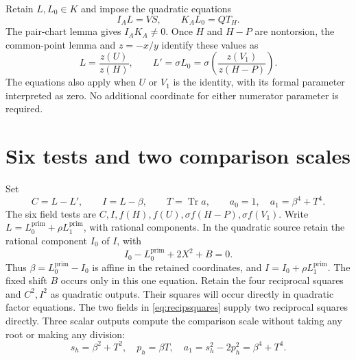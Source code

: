 \documentclass[11pt,a4paper]{article}
\DeclareMathOperator{\Tr}{Tr}\DeclareMathOperator{\Nm}{N}
\begin{document}
Retain $L,L_0\in K$ and impose the quadratic equations
\begin{equation}\label{eq:ratios}
                         I_AL=VS,\qquad K_AL_0=QT_H.
\end{equation}
The pair-chart lemma gives $I_AK_A\ne0$. Once $H$ and $H-P$ are
nontorsion, the common-point lemma and $z=-x/y$ identify these values as
\[
 L=\frac{z(U)}{z(H)},\qquad
 L'=\sigma L_0=\sigma\!\left(\frac{z(V_1)}{z(H-P)}\right).
\]
The equations also apply when $U$ or $V_1$ is the identity, with its
formal parameter interpreted as zero. No additional coordinate for
either numerator parameter is required.

\section{Six tests and two comparison scales}

Set
\[
 C=L-L',\qquad I=L-\beta,\qquad T=\Tr a,
 \qquad a_0=1,\quad a_1=\beta^4+T^4.
\]
The six field tests are $C,I,f(H),f(U),\sigma f(H-P),\sigma f(V_1)$.
Write $L=L_0^{\mathrm{prim}}+\rho L_1^{\mathrm{prim}}$, with rational components.
In the quadratic source retain the rational component $I_0$ of $I$, with
\[
                  I_0-L_0^{\mathrm{prim}}+2X^2+B=0.
\]
Thus $\beta=L_0^{\mathrm{prim}}-I_0$ is affine in the retained
coordinates, and $I=I_0+\rho L_1^{\mathrm{prim}}$.
The fixed shift $B$ occurs only in this one equation.
Retain the four reciprocal squares and $C^2,I^2$ as quadratic outputs.
Their squares will occur directly in quadratic factor equations. The two fields in
\eqref{eq:recipsquares} supply two reciprocal squares directly.
Three scalar outputs compute the comparison scale without taking any
root or making any division:
\[
 s_h=\beta^2+T^2,\quad p_h=\beta T,\quad
 a_1=s_h^2-2p_h^2=\beta^4+T^4.
\]
\end{document}
